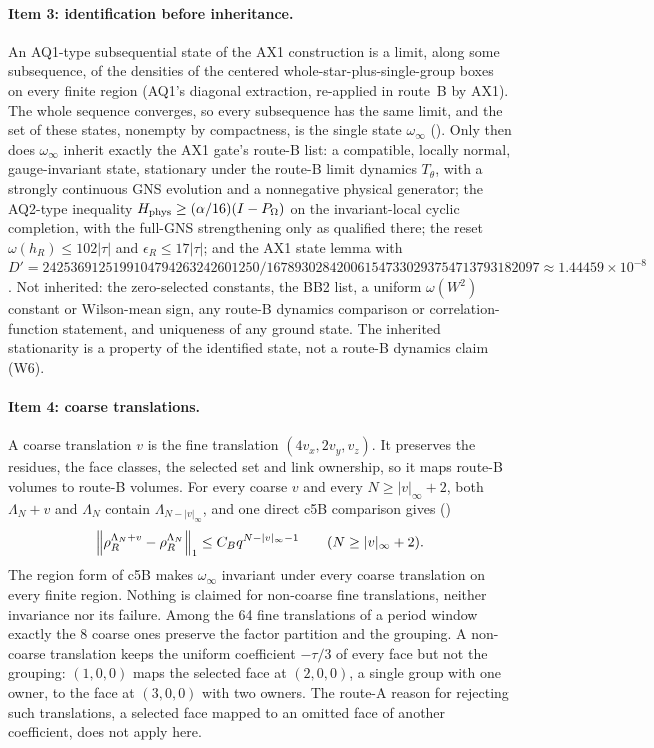 \paragraph{Item 3: identification before inheritance.} An AQ1-type
subsequential state of the AX1 construction is a limit, along some
subsequence, of the densities of the centered whole-star-plus-single-group
boxes on every finite region (AQ1's diagonal extraction, re-applied in
route~B by AX1). The whole sequence converges, so every subsequence has the
same limit, and the set of these states, nonempty by compactness, is the
single state $\omega_\infty$ (). Only then does
$\omega_\infty$ inherit exactly the AX1 gate's route-B list: a compatible,
locally normal, gauge-invariant state, stationary under the route-B limit
dynamics $T_\theta$, with a strongly continuous GNS evolution and a
nonnegative physical generator; the AQ2-type inequality
$H_{\rm phys}\ge(\alpha/16)(I-P_\Omega)$ on the invariant-local cyclic
completion, with the full-GNS strengthening only as qualified there; the
reset $\omega(h_R)\le102|\tau|$ and $\epsilon_R\le17|\tau|$; and the AX1 state
lemma with
$D'=2425369125199104794263242601250/167893028420061547330293754713793182097\approx1.44459\times10^{-8}$.
Not inherited: the zero-selected constants, the BB2 list, a uniform
$\omega(W^2)$ constant or Wilson-mean sign, any route-B dynamics comparison or
correlation-function statement, and uniqueness of any ground state. The
inherited stationarity is a property of the identified state, not a route-B
dynamics claim (W6).

\paragraph{Item 4: coarse translations.} A coarse translation $v$ is the fine
translation $(4v_x,2v_y,v_z)$. It preserves the residues, the face classes,
the selected set and link ownership, so it maps route-B volumes to route-B
volumes. For every coarse $v$ and every $N\ge|v|_\infty+2$, both
$\Lambda_N+v$ and $\Lambda_N$ contain $\Lambda_{N-|v|_\infty}$, and one
direct c5B comparison gives ()
\begin{equation}
 \left\lVert\rho^{\Lambda_N+v}_R-\rho^{\Lambda_N}_R\right\rVert_1\le C_Bq^{N-|v|_\infty-1}\qquad(N\ge|v|_\infty+2).
 \label{eq:bc2-translation}
\end{equation}
The region form of c5B makes $\omega_\infty$ invariant under every coarse
translation on every finite region. Nothing is claimed for non-coarse fine
translations, neither invariance nor its failure. Among the 64 fine
translations of a period window exactly the 8 coarse ones preserve the factor
partition and the grouping. A non-coarse translation keeps the uniform
coefficient $-\tau/3$ of every face but not the grouping: $(1,0,0)$ maps the
selected face at $(2,0,0)$, a single group with one owner, to the face at
$(3,0,0)$ with two owners. The route-A reason for rejecting such translations,
a selected face mapped to an omitted face of another coefficient, does not
apply here.

